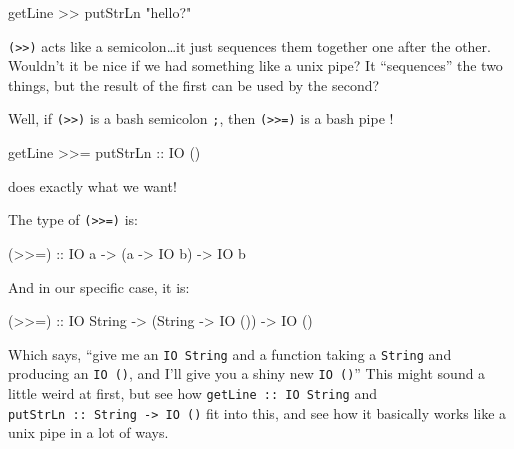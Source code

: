 \documentclass[]{article}
\newenvironment{Shaded}{}{}
\newcommand{\DataTypeTok}[1]{\textcolor[rgb]{0.56,0.13,0.00}{{#1}}}
\newcommand{\StringTok}[1]{\textcolor[rgb]{0.25,0.44,0.63}{{#1}}}
\newcommand{\OtherTok}[1]{\textcolor[rgb]{0.00,0.44,0.13}{{#1}}}
\newcommand{\FunctionTok}[1]{\textcolor[rgb]{0.02,0.16,0.49}{{#1}}}
\newcommand{\NormalTok}[1]{{#1}}
\begin{document}
\begin{Shaded}
\begin{Highlighting}[]
\NormalTok{getLine }\FunctionTok{>>} \NormalTok{putStrLn }\StringTok{"hello?"}
\end{Highlighting}
\end{Shaded}

\texttt{(\textgreater{}\textgreater{})} acts like a semicolon\ldots{}it
just sequences them together one after the other. Wouldn't it be nice if
we had something like a unix pipe? It ``sequences'' the two things, but
the result of the first can be used by the second?

Well, if \texttt{(\textgreater{}\textgreater{})} is a bash semicolon
\texttt{;}, then \texttt{(\textgreater{}\textgreater{}=)} is a bash pipe
\texttt{\textbar{}}!

\begin{Shaded}
\begin{Highlighting}[]
\NormalTok{getLine }\FunctionTok{>>=} \NormalTok{putStrLn}
\OtherTok{                      ::} \DataTypeTok{IO} \NormalTok{()}
\end{Highlighting}
\end{Shaded}

does exactly what we want!

The type of \texttt{(\textgreater{}\textgreater{}=)} is:

\begin{Shaded}
\begin{Highlighting}[]
\OtherTok{(>>=) ::} \DataTypeTok{IO} \NormalTok{a }\OtherTok{->} \NormalTok{(a }\OtherTok{->} \DataTypeTok{IO} \NormalTok{b) }\OtherTok{->} \DataTypeTok{IO} \NormalTok{b}
\end{Highlighting}
\end{Shaded}

And in our specific case, it is:

\begin{Shaded}
\begin{Highlighting}[]
\OtherTok{(>>=) ::} \DataTypeTok{IO} \DataTypeTok{String} \OtherTok{->} \NormalTok{(}\DataTypeTok{String} \OtherTok{->} \DataTypeTok{IO} \NormalTok{()) }\OtherTok{->} \DataTypeTok{IO} \NormalTok{()}
\end{Highlighting}
\end{Shaded}

Which says, ``give me an \texttt{IO\ String} and a function taking a
\texttt{String} and producing an \texttt{IO\ ()}, and I'll give you a
shiny new \texttt{IO\ ()}'' This might sound a little weird at first,
but see how \texttt{getLine\ ::\ IO\ String} and
\texttt{putStrLn\ ::\ String\ -\textgreater{}\ IO\ ()} fit into this,
and see how it basically works like a unix pipe in a lot of ways.
\end{document}
